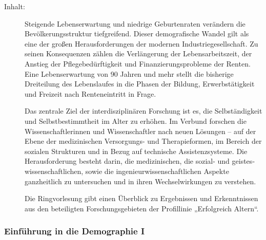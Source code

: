 \documentclass[%
a4paper, %
11pt,               %
leqno,              %
fleqn,              %
]
{scrartcl}
\begin{document}
\begin{description}
  \item[Inhalt:] Steigende Lebenserwartung und niedrige Geburtenraten verändern
    die Bevölkerungsstruktur tiefgreifend. Dieser demografische Wandel gilt als
    eine der großen Herausforderungen der modernen Industriegesellschaft. Zu
    seinen Konsequenzen zählen die Verlängerung der Lebensarbeitszeit, der
    Anstieg der Pflegebedürftigkeit und Finanzierungsprobleme der Renten. Eine
    Lebenserwartung von 90 Jahren und mehr stellt die bisherige Dreiteilung des
    Lebenslaufes in die Phasen der Bildung, Erwerbstätigkeit und Freizeit nach
    Renteneintritt in Frage.

    Das zentrale Ziel der interdisziplinären Forschung ist es, die
    Selbständigkeit und Selbst­bestimmtheit im Alter zu erhöhen. Im Verbund
    forschen die Wissenschaftlerinnen und Wissen­schaftler nach neuen Lösungen
    -- auf der Ebene der medizinischen Versorgungs- und Therapieformen, im
    Bereich der sozialen Strukturen und in Bezug auf technische
    Assistenz­systeme. Die Herausforderung besteht darin, die medizinischen, die
    sozial- und geistes­wissen­schaftlichen, sowie die
    ingenieurwissenschaftlichen Aspekte ganzheitlich zu untersuchen und in ihren
    Wechselwirkungen zu verstehen.

    Die Ringvorlesung gibt einen Überblick zu Ergebnissen und Erkenntnissen aus
    den beteiligten Forschungsgebieten der Profillinie „Erfolgreich Altern“.
\end{description}


\subsubsection{Einführung in die Demographie I} %
\label{ssub:Einführung in die Demographie I}
\end{document}
